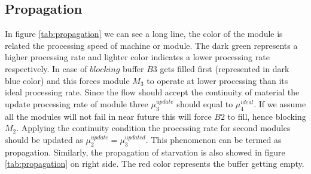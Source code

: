 \subsection{Propagation}
In figure \ref{tab:propagation} we can see a long line, the color of the module is related the processing speed of machine or module. The dark green represents a higher processing rate and lighter color indicates a lower processing rate respectively. In case of $blocking$ buffer $B3$ gets filled first (represented in dark blue color) and this forces module $M_{3}$ to operate at lower processing than its ideal processing rate. Since the flow should accept the continuity of material the update processing rate of module three $\mu^{update}_{3}$ should equal to $\mu^{ideal}_{4}$. If we assume all the modules will not fail in near future this will force $B2$ to fill, hence blocking $M_{2}$. Applying the continuity condition the processing rate for second modules should be updated as $\mu^{update}_{2} = \mu^{updated}_{3}$. This phenomenon can be termed as propagation. Similarly, the propagation of starvation is also showed in figure \ref{tab:propagation} on right side. The red color represents the buffer getting empty. \par
